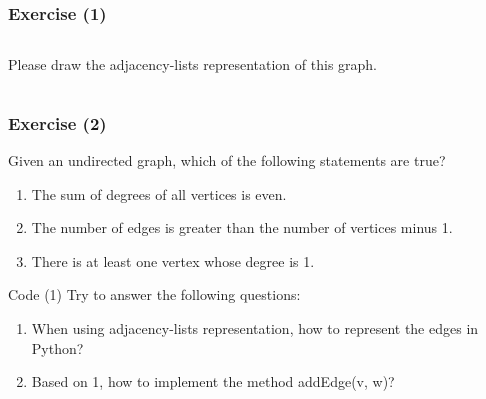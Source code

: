 \documentclass[aspectratio=169, 14pt]{beamer}
\begin{document}
\begin{frame}[fragile]
	\frametitle{Exercise (1)}
	\begin{columns}


		Please draw the adjacency-lists representation of this graph.
	\end{columns}
\end{frame}


\begin{frame}[fragile]
	\frametitle{Exercise (2)}
	Given an undirected graph, which of the following statements are true?

	\begin{enumerate}
		\item The sum of degrees of all vertices is even.
		\item The number of edges is greater than the number of vertices minus 1.
		\item There is at least one vertex whose degree is 1.
	\end{enumerate}


\end{frame}

\begin{frame}{Code (1)}
	Try to answer the following questions:
	\begin{enumerate}
		\item When using adjacency-lists representation, how to represent the edges in Python?
		\item Based on 1, how to implement the method \alert{addEdge(v, w)}?
	\end{enumerate}
\end{frame}
\end{document}
